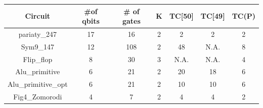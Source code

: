 \footnotesize{
\begin{latin}
\begin{tabular}{c|cccccc}

Circuit&\#of qbits &\# of gates&K&TC[50]&TC[49]&TC(P)\\
\hline

pariaty\_247&17&16&2&2&2&2\\
Sym9\_147&12&108&2&48& N.A.&8\\
Flip\_flop&8&30&3&N.A.&N.A.&4\\
Alu\_primitive&6&21&2&20&18&6\\
Alu\_primitive\_opt&6&21&2&10&10&6\\
Fig4\_Zomorodi&4&7&2&4&4&2\\
\end{tabular}
\end{latin}
}